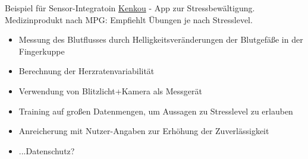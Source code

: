 \documentclass[aspectratio=169,t]{beamer}
\begin{document}
\begin{frame}{Beispiel für Sensor-Integratoin}
	\href{https://www.kenkou.de/}{Kenkou} - App zur Stressbewältigung. Medizinprodukt nach MPG: Empfiehlt Übungen je nach Stresslevel. 
	\begin{itemize}
		\item Messung des Blutflusses durch Helligkeitsveränderungen der Blutgefäße in der Fingerkuppe
		\item Berechnung der Herzratenvariabilität
		\item<2-> Verwendung von Blitzlicht+Kamera als Messgerät
		\item<3-> Training auf großen Datenmengen, um Aussagen zu Stresslevel zu erlauben
		\item<4-> Anreicherung mit Nutzer-Angaben zur Erhöhung der Zuverlässigkeit
		\item<5-> ...Datenschutz?
	\end{itemize}
\end{frame}
\end{document}
